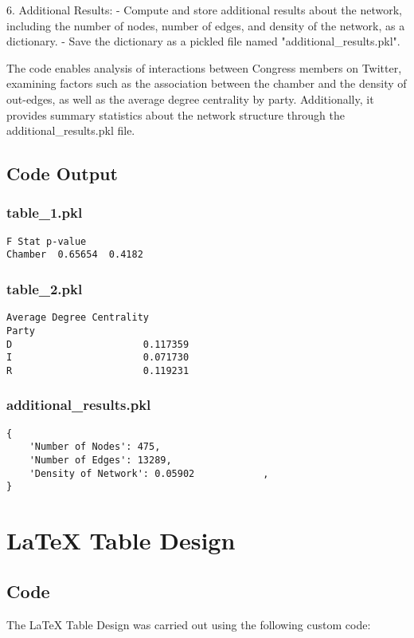 \documentclass[11pt]{article}
\begin{document}
6. Additional Results:
   - Compute and store additional results about the network, including the number of nodes, number of edges, and density of the network, as a dictionary.
   - Save the dictionary as a pickled file named "additional\_results.pkl".

The code enables analysis of interactions between Congress members on Twitter, examining factors such as the association between the chamber and the density of out-edges, as well as the average degree centrality by party. Additionally, it provides summary statistics about the network structure through the additional\_results.pkl file.

\subsection{Code Output}

\subsubsection*{table\_1.pkl}

\begin{Verbatim}[tabsize=4]
          F Stat p-value
Chamber  0.65654  0.4182
\end{Verbatim}

\subsubsection*{table\_2.pkl}

\begin{Verbatim}[tabsize=4]
       Average Degree Centrality
Party
D                       0.117359
I                       0.071730
R                       0.119231
\end{Verbatim}

\subsubsection*{additional\_results.pkl}

\begin{Verbatim}[tabsize=4]
{
    'Number of Nodes': 475,
    'Number of Edges': 13289,
    'Density of Network': 0.05902            ,
}
\end{Verbatim}

\section{LaTeX Table Design}
\subsection{{Code}}
The LaTeX Table Design was carried out using the following custom code:
\end{document}

